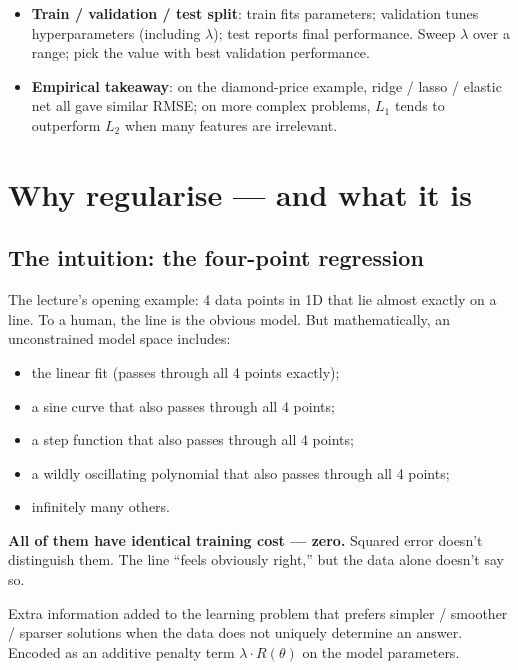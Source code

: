 \documentclass[11pt, a4paper]{article}
\begin{document}
\begin{tldrbox}
\begin{itemize}[leftmargin=*]
  \item \textbf{Train / validation / test split}: train fits parameters; validation tunes hyperparameters (including $\lambda$); test reports final performance. Sweep $\lambda$ over a range; pick the value with best validation performance.
  \item \textbf{Empirical takeaway}: on the diamond-price example, ridge / lasso / elastic net all gave similar RMSE; on more complex problems, $L_1$ tends to outperform $L_2$ when many features are irrelevant.
\end{itemize}
\end{tldrbox}

\section{Why regularise --- and what it is}

\subsection{The intuition: the four-point regression}

The lecture's opening example: 4 data points in 1D that lie almost exactly on a line. To a human, the line is the obvious model. But mathematically, an unconstrained model space includes:

\begin{itemize}
  \item the linear fit (passes through all 4 points exactly);
  \item a sine curve that also passes through all 4 points;
  \item a step function that also passes through all 4 points;
  \item a wildly oscillating polynomial that also passes through all 4 points;
  \item infinitely many others.
\end{itemize}

\textbf{All of them have identical training cost — zero.} Squared error doesn't distinguish them. The line ``feels obviously right,'' but the data alone doesn't say so.

\begin{defbox}
Extra information added to the learning problem that prefers simpler / smoother / sparser solutions when the data does not uniquely determine an answer. Encoded as an additive penalty term $\lambda \cdot R(\theta)$ on the model parameters.
\end{defbox}
\end{document}
